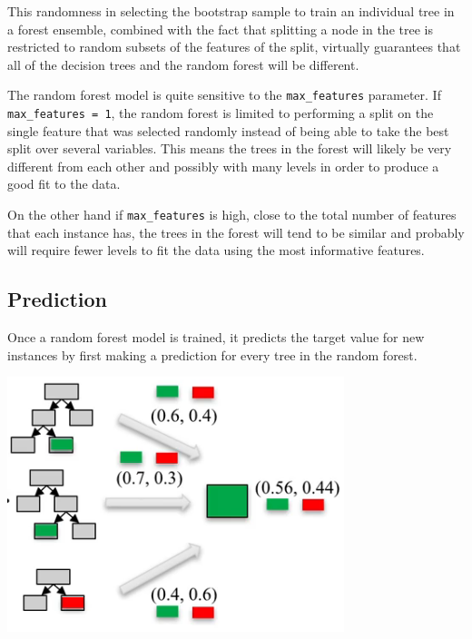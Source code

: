 \begin{multicols}{2}
This randomness in selecting the bootstrap sample to train an individual tree in a forest ensemble, combined with the fact that splitting a node in the tree is restricted to random subsets of the features of the split, virtually guarantees that all of the decision trees and the random forest will be different. 

The random forest model is quite sensitive to the \texttt{max_features} parameter. If \texttt{max_features = 1}, the random forest is limited to performing a split on the single feature that was selected randomly instead of being able to take the best split over several variables. This means the trees in the forest will likely be very different from each other and possibly with many levels in order to produce a good fit to the data. 

On the other hand if \texttt{max_features} is high, close to the total number of features that each instance has, the trees in the forest will tend to be similar and probably will require fewer levels to fit the data using the most informative features. 

\subsection{Prediction}

Once a random forest model is trained, it predicts the target value for new instances by first making a prediction for every tree in the random forest. 

\begin{center}
	\includegraphics[width=\linewidth]{img/Random-Forest-Prediction.png} 
\end{center}


\end{multicols}
